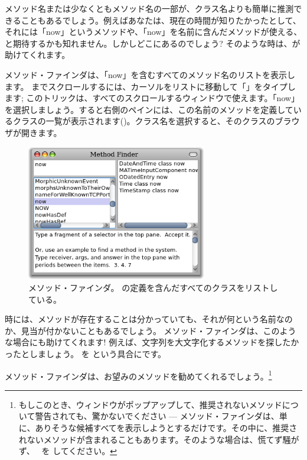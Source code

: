 \documentclass[a4paper,10pt,twoside]{book}
\begin{document}
メソッド名または少なくともメソッド名の一部が、クラス名よりも簡単に推測できることもあるでしょう。例えばあなたは、現在の時間が知りたかったとして、それには「now」というメソッドや、「now」を名前に含んだメソッドが使える、と期待するかも知れません。しかしどこにあるのでしょう?
そのような時は、が助けてくれます。

メソッド・ファインダは、「now」を含むすべてのメソッド名のリストを表示します。
 までスクロールするには、カーソルをリストに移動して「」をタイプします; このトリックは、すべてのスクロールするウィンドウで使えます。「now」を選択しましょう。すると右側のペインには、この名前のメソッドを定義しているクラスの一覧が表示されます()。クラス名を選択すると、そのクラスのブラウザが開きます。

\begin{figure}[hbt]
\centerline {\includegraphics[width=0.7\textwidth]{methodFinder-now}}
\caption{メソッド・ファインダ。 の定義を含んだすべてのクラスをリストしている。
}
\end{figure}

時には、メソッドが存在することは分かっていても、それが何という名前なのか、見当が付かないこともあるでしょう。
メソッド・ファインダは、このような場合にも助けてくれます! 例えば、文字列を大文字化するメソッドを探したかったとしましょう。 を  という具合にです。

\noindent
メソッド・ファインダは、お望みのメソッドを勧めてくれるでしょう。\footnote{もしこのとき、ウィンドウがポップアップして、推奨されないメソッドについて警告されても、驚かないでください --- メソッド・ファインダは、単に、ありそうな候補すべてを表示しようとするだけです。その中に、推奨されないメソッドが含まれることもあります。そのような場合は、慌てず騒がず、~ を \click してください。}
\end{document}

